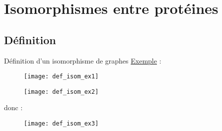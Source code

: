 \section{Isomorphismes entre protéines}
\subsection{Définition}
\begin{frame}{Définition d'un isomorphisme de graphes}
\footnotesize
{}
\newline
\newline
\underline{Exemple} :
    \begin{figure}[!htb]
        \texttt{[image: def\_isom\_ex1]}
    \end{figure}
\end{frame}

\begin{frame}
    \begin{figure}[!htb]
        \texttt{[image: def\_isom\_ex2]}
    \end{figure} 
    donc :
    \begin{figure}
        \texttt{[image: def\_isom\_ex3]}
    \end{figure}
\end{frame}

